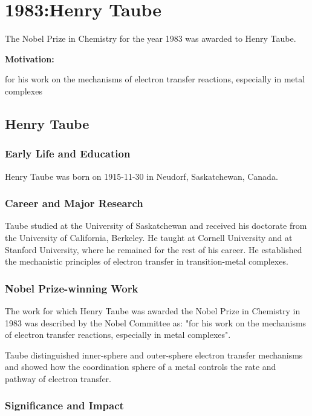 \chapter{1983:Henry Taube}

\label{chap:chemistry1983}

The Nobel Prize in Chemistry for the year 1983 was awarded to Henry Taube.

\textbf{Motivation:}

for his work on the mechanisms of electron transfer reactions, especially in metal complexes

\section{Henry Taube}

\subsection*{Early Life and Education}

Henry Taube was born on 1915-11-30 in Neudorf, Saskatchewan, Canada.

\subsection*{Career and Major Research}

Taube studied at the University of Saskatchewan and received his doctorate from the University of California, Berkeley. He taught at Cornell University and at Stanford University, where he remained for the rest of his career. He established the mechanistic principles of electron transfer in transition-metal complexes.

\subsection*{Nobel Prize-winning Work}

The work for which Henry Taube was awarded the Nobel Prize in Chemistry in 1983 was described by the Nobel Committee as: "for his work on the mechanisms of electron transfer reactions, especially in metal complexes".

Taube distinguished inner-sphere and outer-sphere electron transfer mechanisms and showed how the coordination sphere of a metal controls the rate and pathway of electron transfer.

\subsection*{Significance and Impact}

